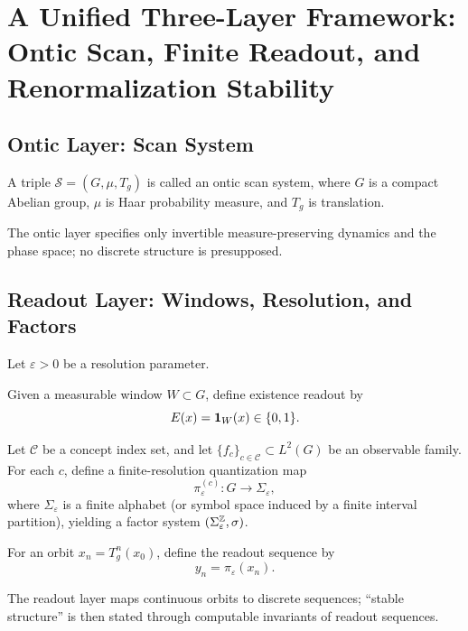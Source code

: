 ﻿\section{A Unified Three-Layer Framework: Ontic Scan, Finite Readout, and Renormalization Stability}

\subsection{Ontic Layer: Scan System}

\begin{definition}
A triple $\mathcal{S}=(G,\mu,T_g)$ is called an ontic scan system, where $G$ is a compact Abelian group, $\mu$ is Haar probability measure, and $T_g$ is translation.
\end{definition}

The ontic layer specifies only invertible measure-preserving dynamics and the phase space; no discrete structure is presupposed.

\subsection{Readout Layer: Windows, Resolution, and Factors}

Let $\varepsilon>0$ be a resolution parameter.
\begin{definition}
Given a measurable window $W\subset G$, define existence readout by
\[
E(x)=\mathbf{1}_W(x)\in\{0,1\}.
\]
\end{definition}

\begin{definition}
Let $\mathcal{C}$ be a concept index set, and let $\{f_c\}_{c\in\mathcal{C}}\subset L^2(G)$ be an observable family. For each $c$, define a finite-resolution quantization map
\[
\pi_\varepsilon^{(c)}:G\to \Sigma_\varepsilon,
\]
where $\Sigma_\varepsilon$ is a finite alphabet (or symbol space induced by a finite interval partition), yielding a factor system $(\Sigma_\varepsilon^{\mathbb{Z}},\sigma)$.
\end{definition}

\begin{definition}
For an orbit $x_n=T_g^n(x_0)$, define the readout sequence by
\[
y_n=\pi_\varepsilon(x_n).
\]
\end{definition}

The readout layer maps continuous orbits to discrete sequences; ``stable structure'' is then stated through computable invariants of readout sequences.

